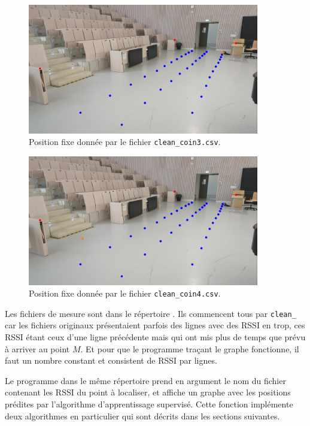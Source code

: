 \documentclass[french, a4paper, 12pt, parskip]{scrartcl}
\begin{document}
\begin{figure}[p]
    \centering
    \includegraphics[width=0.9\textwidth]{amphi-bleu-orange3.jpeg}
    \caption{Position fixe  donnée par le fichier \texttt{clean\_coin3.csv}.}
    \label{fig:amphi-fp-o3}
\end{figure}

\begin{figure}[p]
    \centering
    \includegraphics[width=0.9\textwidth]{amphi-bleu-orange4.jpeg}
    \caption{Position fixe  donnée par le fichier \texttt{clean\_coin4.csv}.}
    \label{fig:amphi-fp-o4}
\end{figure}

Les fichiers de mesure sont dans le répertoire
. Ils commencent tous par \verb+clean_+ car
les fichiers originaux présentaient parfois des lignes avec des RSSI en trop,
ces RSSI étant ceux d'une ligne précédente mais qui ont mis plus de temps que
prévu à arriver au point $M$. Et pour que le programme traçant le graphe
fonctionne, il faut un nombre constant et consistent de RSSI par lignes.

Le programme  dans le même répertoire prend en argument le nom
du fichier contenant les RSSI du point à localiser, et affiche un graphe avec
les positions prédites par l'algorithme d'apprentissage supervisé. Cette
fonction implémente deux algorithmes en particulier qui sont décrits dans les
sections suivantes.
\end{document}
